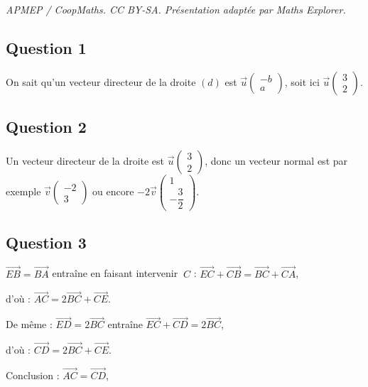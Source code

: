 \documentclass[10pt]{article}
\begin{document}
\noindent\textit{APMEP / CoopMaths. CC BY-SA. Présentation adaptée par Maths Explorer.}\par\medskip
\subsection*{Question 1}

On sait qu'un vecteur directeur de la droite \((\textit{d})\) est \(\vec{u} \begin{pmatrix} -b \\ a \end{pmatrix}\), soit ici \(\vec{u} \begin{pmatrix} 3 \\ 2 \end{pmatrix}\).

\subsection*{Question 2}

Un vecteur directeur de la droite est \(\vec{u} \begin{pmatrix} 3 \\ 2 \end{pmatrix}\), donc un vecteur normal est par exemple \(\vec{v} \begin{pmatrix} -2 \\ 3 \end{pmatrix}\) ou encore \(-2 \vec{v} \begin{pmatrix} 1 \\ -\dfrac{3}{2} \end{pmatrix}\).

\subsection*{Question 3}

\(\overrightarrow{EB} = \overrightarrow{BA}\) entraîne en faisant intervenir \(\ C\) :
\(\overrightarrow{EC} + \overrightarrow{CB} = \overrightarrow{BC} + \overrightarrow{CA}\),

d'où : \(\overrightarrow{AC} = 2 \overrightarrow{BC} + \overrightarrow{CE}\).

De même : \(\overrightarrow{ED} = 2 \overrightarrow{BC}\) entraîne \(\overrightarrow{EC} + \overrightarrow{CD} = 2 \overrightarrow{BC}\),

d'où : \(\overrightarrow{CD} = 2 \overrightarrow{BC} + \overrightarrow{CE}\).

Conclusion : \(\overrightarrow{AC} = \overrightarrow{CD}\),
\end{document}
